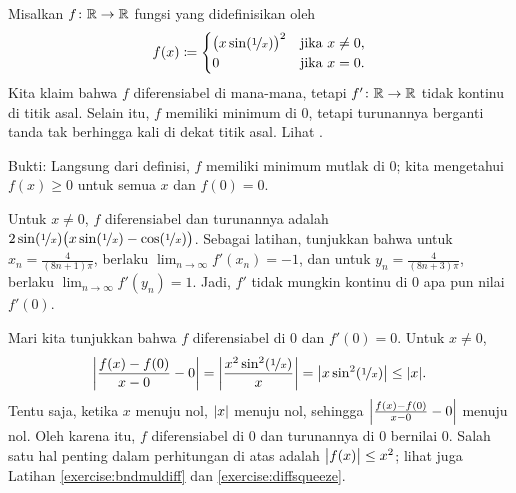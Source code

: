 \begin{example} \label{baddifffunc:example}
Misalkan $f \colon {\mathbb{R}} \to {\mathbb{R}}$ fungsi yang didefinisikan oleh
\begin{equation*}
f(x) \coloneqq
\begin{cases}
{\bigl( x \sin(\nicefrac{1}{x}) \bigr)}^2 & \text{jika } x \neq 0, \\
0 & \text{jika } x = 0.
\end{cases}
\end{equation*}
Kita klaim bahwa $f$ diferensiabel di mana-mana, tetapi
$f' \colon {\mathbb{R}} \to {\mathbb{R}}$ tidak kontinu di
titik asal.  Selain itu, $f$ memiliki minimum di $0$, tetapi turunannya
berganti tanda tak berhingga kali di dekat titik asal.
Lihat .
\begin{myfigureht}
\caption{Fungsi dengan turunan diskontinu. Fungsi $f$ berada di sebelah kiri
dan $f'$ di sebelah kanan.  Perhatikan bahwa $f(x) \leq x^2$ pada grafik kiri.\label{fig:nonc1diff}}
\end{myfigureht}

Bukti: Langsung dari definisi, $f$ memiliki
minimum mutlak di $0$; kita mengetahui $f(x) \geq 0$ untuk semua $x$ dan $f(0) = 0$.

Untuk $x \neq 0$,
$f$ diferensiabel
dan
turunannya
adalah $2 \sin (\nicefrac{1}{x}) \bigl( x \sin (\nicefrac{1}{x}) -
\cos(\nicefrac{1}{x}) \bigr)$.
Sebagai latihan, tunjukkan bahwa untuk $x_n = \frac{4}{(8n+1)\pi}$,
berlaku
$\lim_{n\to\infty} f'(x_n) = -1$, dan untuk
$y_n = \frac{4}{(8n+3)\pi}$, berlaku
$\lim_{n\to\infty} f'(y_n) = 1$.  Jadi, $f'$
tidak mungkin kontinu di $0$
apa pun nilai $f'(0)$.

Mari kita tunjukkan bahwa $f$ diferensiabel di $0$ dan $f'(0)=0$.
Untuk $x \neq 0$,
\begin{equation*}
\left\lvert {\frac{f(x)-f(0)}{x-0} - 0} \right\rvert
=
\left\lvert {\frac{x^2 \sin^2(\nicefrac{1}{x})}{x}} \right\rvert
=
\bigl\lvert {x \sin^2(\nicefrac{1}{x})} \bigr\rvert
\leq
\lvert {x} \rvert .
\end{equation*}
Tentu saja, ketika $x$ menuju nol, $\lvert {x} \rvert$ menuju nol, sehingga
$\left\lvert {\frac{f(x)-f(0)}{x-0} - 0} \right\rvert$ menuju nol.  Oleh karena itu, $f$
diferensiabel di 0 dan turunannya di 0 bernilai 0.
Salah satu hal penting dalam perhitungan di atas
adalah $\bigl\lvert {f(x)} \bigr\rvert \leq x^2$;
lihat juga Latihan \ref{exercise:bndmuldiff} dan
\ref{exercise:diffsqueeze}.
\end{example}


